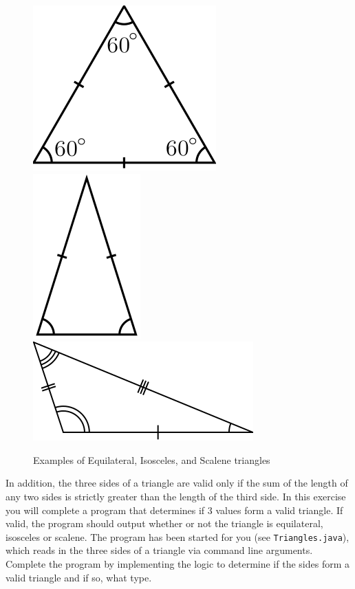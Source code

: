 \documentclass[12pt]{scrartcl}
\begin{document}
\begin{figure}[h]
\centering
\includegraphics[scale=0.50]{triangleEquilateral}~~~~~~~
\includegraphics[scale=0.50]{triangleIsosceles}~~~~~~~
\includegraphics[scale=0.50]{triangleScalene}
\caption{Examples of Equilateral, Isosceles, and Scalene triangles}
\label{fig:triangles}
\end{figure}

In addition, the three sides of a triangle are valid only if the sum of the 
length of any two sides is strictly greater than the length of the third side.  
In this exercise you will complete a program that determines if 3 values 
form a valid triangle.  If valid, the program should output whether or not 
the triangle is equilateral, isosceles or scalene.  The program has been 
started for you (see \texttt{Triangles.java}), which reads in the three sides of a 
triangle via command line arguments.  Complete the program by 
implementing the logic to determine if the sides form a valid triangle 
and if so, what type.
\end{document}
